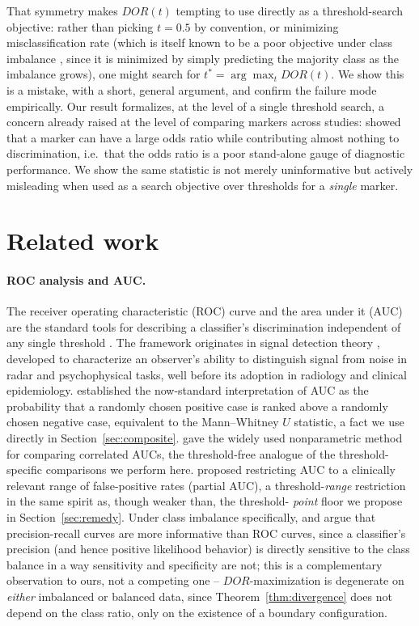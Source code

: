 \documentclass[11pt]{article}
\begin{document}
That symmetry makes $DOR(t)$ tempting to use directly as a threshold-search
objective: rather than picking $t=0.5$ by convention, or minimizing
misclassification rate (which is itself known to be a poor objective under
class imbalance
\citep{provost1998,he2009,chawla2002}, since it is minimized by simply
predicting the majority class as the imbalance grows), one might search for
$t^\ast = \arg\max_t DOR(t)$. We show this is a mistake, with a short,
general argument, and confirm the failure mode empirically. Our result
formalizes, at the level of a single threshold search, a concern already
raised at the level of comparing markers across studies: \citet{pepe2004}
showed that a marker can have a large odds ratio while contributing almost
nothing to discrimination, i.e.\ that the odds ratio is a poor stand-alone
gauge of diagnostic performance. We show the same statistic is not merely
uninformative but actively misleading when used as a search objective over
thresholds for a \emph{single} marker.

\section{Related work}

\paragraph{ROC analysis and AUC.} The receiver operating characteristic
(ROC) curve and the area under it (AUC) are the standard tools for
describing a classifier's discrimination independent of any single
threshold \citep{metz1978,swets1988,hanley1982,zweig1993,obuchowski2003,
zou2007,fawcett2006}. The framework originates in signal detection theory
\citep{greenswets1966}, developed to characterize an observer's ability to
distinguish signal from noise in radar and psychophysical tasks, well before
its adoption in radiology and clinical epidemiology. \citet{hanley1982}
established the now-standard interpretation of AUC as the probability that
a randomly chosen positive case is ranked above a randomly chosen negative
case, equivalent to the Mann--Whitney $U$ statistic, a fact we use directly
in Section~\ref{sec:composite}. \citet{delong1988} gave the widely used
nonparametric method for comparing correlated AUCs, the threshold-free
analogue of the threshold-specific comparisons we perform here.
\citet{mcclish1989} proposed restricting AUC to a clinically relevant
range of false-positive rates (partial AUC), a threshold-\emph{range}
restriction in the same spirit as, though weaker than, the threshold-
\emph{point} floor we propose in Section~\ref{sec:remedy}. Under class
imbalance specifically, \citet{davis2006} and \citet{saito2015} argue that
precision-recall curves are more informative than ROC curves, since a
classifier's precision (and hence positive likelihood behavior) is directly
sensitive to the class balance in a way sensitivity and specificity are
not; this is a complementary observation to ours, not a competing one --
$DOR$-maximization is degenerate on \emph{either} imbalanced or balanced
data, since Theorem~\ref{thm:divergence} does not depend on the class
ratio, only on the existence of a boundary configuration.
\end{document}
